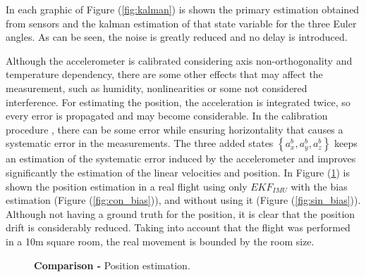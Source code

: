 \documentclass[conference]{IEEEtran}
\newcommand{\refp}[1]{(\ref{#1})}
\begin{document}
In each graphic of Figure \refp{fig:kalman} is shown the primary estimation obtained from sensors and the kalman estimation of that state variable for the three Euler angles. As can be seen, the noise is greatly reduced and no delay is introduced.

Although the accelerometer is calibrated considering axis non-orthogonality and temperature dependency, there are some other effects that may affect the measurement, such as humidity, nonlinearities or some not considered interference. For estimating the position, the acceleration is integrated twice, so every error is propagated and may become considerable. In the calibration procedure \cite{bib:nosotros}, there can be some error while ensuring horizontality that causes a systematic error in the measurements. The three added states $\left\lbrace a_x^b,a_y^b,a_z^b\right\rbrace$ keeps an estimation of the systematic error induced by the accelerometer and improves significantly the estimation of the linear velocities and position. In Figure \refp{fig:efecto_bias} is shown the position estimation in a real flight using only $EKF_{IMU}$ with the bias estimation (Figure \refp{fig:con_bias}), and without using it (Figure \refp{fig:sin_bias}). Although not having a ground truth for the position, it is clear that the position drift is considerably reduced. Taking into account that the flight was performed in a 10m square room, the real movement is bounded by the room size.\\

\begin{figure}
  \centering
   \hspace*{-5pt}
  \caption{\textbf{Comparison -} Position estimation.}
  \label{fig:efecto_bias}
\end{figure}
\end{document}
